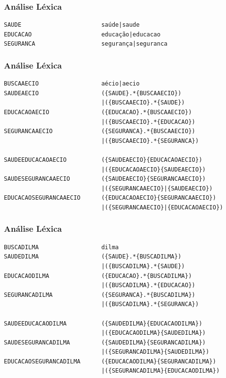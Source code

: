 
\begin{frame}[fragile]
\frametitle{Análise Léxica}
\begin{example}
\begin{verbatim}
SAUDE						saúde|saude
EDUCACAO					educação|educacao
SEGURANCA					segurança|seguranca\end{verbatim}
\end{example}
\end{frame}


\begin{frame}[fragile]
\frametitle{Análise Léxica}
\begin{example}
\begin{verbatim}
BUSCAAECIO 					aécio|aecio
SAUDEAECIO 					({SAUDE}.*{BUSCAAECIO})
							|({BUSCAAECIO}.*{SAUDE})
EDUCACAOAECIO				({EDUCACAO}.*{BUSCAAECIO})
							|({BUSCAAECIO}.*{EDUCACAO})
SEGURANCAAECIO				({SEGURANCA}.*{BUSCAAECIO})
							|({BUSCAAECIO}.*{SEGURANCA})

SAUDEEDUCACAOAECIO			({SAUDEAECIO}{EDUCACAOAECIO})
							|({EDUCACAOAECIO}{SAUDEAECIO})
SAUDESEGURANCAAECIO			({SAUDEAECIO}{SEGURANCAAECIO})
							|({SEGURANCAAECIO}|{SAUDEAECIO})
EDUCACAOSEGURANCAAECIO		({EDUCACAOAECIO}{SEGURANCAAECIO})
							|({SEGURANCAAECIO}|{EDUCACAOAECIO})\end{verbatim}
\end{example}
\end{frame}


\begin{frame}[fragile]
\frametitle{Análise Léxica}
\begin{example}
\begin{verbatim}
BUSCADILMA 					dilma
SAUDEDILMA 					({SAUDE}.*{BUSCADILMA})
							|({BUSCADILMA}.*{SAUDE})
EDUCACAODILMA				({EDUCACAO}.*{BUSCADILMA})
							|({BUSCADILMA}.*{EDUCACAO})
SEGURANCADILMA				({SEGURANCA}.*{BUSCADILMA})
							|({BUSCADILMA}.*{SEGURANCA})

SAUDEEDUCACAODILMA			({SAUDEDILMA}{EDUCACAODILMA})
							|({EDUCACAODILMA}{SAUDEDILMA})
SAUDESEGURANCADILMA			({SAUDEDILMA}{SEGURANCADILMA})
							|({SEGURANCADILMA}{SAUDEDILMA})
EDUCACAOSEGURANCADILMA		({EDUCACAODILMA}{SEGURANCADILMA})
							|({SEGURANCADILMA}{EDUCACAODILMA})\end{verbatim}
\end{example}
\end{frame}

